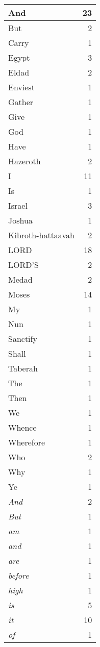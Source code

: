 \begin{center}
\begin{longtable}{l|r}
\hline \hline
\endlastfoot
And & 23 \\ \hline
But & 2 \\ \hline
Carry & 1 \\ \hline
Egypt & 3 \\ \hline
Eldad & 2 \\ \hline
Enviest & 1 \\ \hline
Gather & 1 \\ \hline
Give & 1 \\ \hline
God & 1 \\ \hline
Have & 1 \\ \hline
Hazeroth & 2 \\ \hline
I & 11 \\ \hline
Is & 1 \\ \hline
Israel & 3 \\ \hline
Joshua & 1 \\ \hline
Kibroth-hattaavah & 2 \\ \hline
LORD & 18 \\ \hline
LORD'S & 2 \\ \hline
Medad & 2 \\ \hline
Moses & 14 \\ \hline
My & 1 \\ \hline
Nun & 1 \\ \hline
Sanctify & 1 \\ \hline
Shall & 1 \\ \hline
Taberah & 1 \\ \hline
The & 1 \\ \hline
Then & 1 \\ \hline
We & 1 \\ \hline
Whence & 1 \\ \hline
Wherefore & 1 \\ \hline
Who & 2 \\ \hline
Why & 1 \\ \hline
Ye & 1 \\ \hline
\emph{And} & 2 \\ \hline
\emph{But} & 1 \\ \hline
\emph{am} & 1 \\ \hline
\emph{and} & 1 \\ \hline
\emph{are} & 1 \\ \hline
\emph{before} & 1 \\ \hline
\emph{high} & 1 \\ \hline
\emph{is} & 5 \\ \hline
\emph{it} & 10 \\ \hline
\emph{of} & 1 \\ \hline

\end{longtable}
\end{center}
